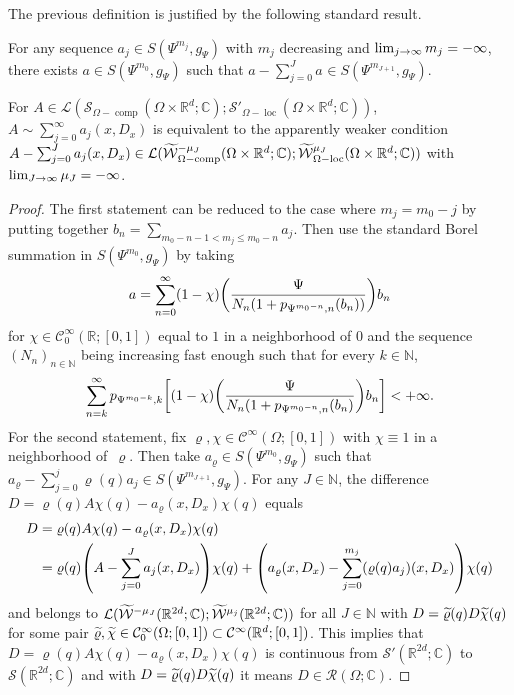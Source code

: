 \documentclass[10pt]{amsart}
\theoremstyle{definition}\newtheorem{defi}[theo]{Definition}\newtheorem{rema}[theo]{Remark}\newtheorem{exam}[theo]{Example}\newtheorem{exem}[theo]{Example}\newtheorem{nota}[theo]{Notation}
\newcommand{\C}{\mathbb{C}}
\newcommand{\R}{\mathbb{R}}
\newcommand{\N}{\mathbb{N}}
\newcommand{\clW}{\mathcal{W}}
\newcommand{\clC}{\mathcal{C}}
\newcommand{\clS}{\mathcal{S}}
\newcommand{\clL}{\mathcal{L}}
\newcommand{\clR}{\mathcal{R}}
\DeclareMathOperator{\ccomp}{comp}
\DeclareMathOperator{\locc}{loc}
\let\oldtilde\tilde
\renewcommand*{\tilde}[1]{\mathchoice{\widetilde{#1}}{\widetilde{#1}}{\oldtilde{#1}}{\oldtilde{#1}}}
\let\originalleft\left
\let\originalright\right
\renewcommand{\left}{\mathopen{}\mathclose\bgroup\originalleft}
\renewcommand{\right}{\aftergroup\egroup\originalright}
\renewcommand*{\to}{\mathchoice{\longrightarrow}{\rightarrow}{\rightarrow}{\rightarrow}}
\begin{document}
The previous definition is justified by the following standard result.
\begin{prop}\label{pr:asympsum}
For any sequence $a_{j}\in S(\Psi^{m_{j}},g_{\Psi})$ with $m_{j}$ decreasing and $\lim_{j\to\infty}m_{j}=-\infty$, there exists $a\in S(\Psi^{m_{0}},g_{\Psi})$ such that $a-\sum_{j=0}^{J}a_{}\in S(\Psi^{m_{J+1}},g_{\Psi})$.

For $A\in \clL(\clS_{\Omega-\ccomp}(\Omega\times\R^{d};\C);\clS'_{\Omega-\locc}(\Omega\times\R^{d};\C))$, $A\sim \sum_{j=0}^{\infty}a_{j}(x,D_{x})$ is equivalent to the apparently weaker condition $A-\sum_{j=0}^{J}a_{j}(x,D_{x})\in \clL(\tilde{\clW}^{-\mu_{J}}_{\Omega-\ccomp}(\Omega\times\R^{d};\C);\tilde{\clW}^{\mu_{J}}_{\Omega-\locc}(\Omega\times\R^{d};\C))$ with $\lim_{J\to\infty}\mu_{J}=-\infty$.
\end{prop}

\begin{proof}
The first statement can be reduced to the case where $m_{j}=m_{0}-j$ by putting together $b_{n}=\sum_{m_{0}-n-1<m_{j}\leq m_{0}-n}a_{j}$. Then use the standard Borel summation in $S(\Psi^{m_{0}},g_{\Psi})$ by taking
\[
a=\sum_{n=0}^{\infty}(1-\chi)\left(\frac{\Psi}{N_{n}(1+p_{\Psi^{m_{0}-n},n}(b_{n}))}\right) b_{n}
\]
for $\chi\in \clC^{\infty}_{0}(\R;[0,1])$ equal to $1$ in a neighborhood of $0$ and the sequence $(N_{n})_{n\in \N}$ being increasing fast enough such that for every $k\in \N$,
\[
\sum_{n=k}^{\infty}p_{\Psi^{m_{0}-k},k}\left[(1-\chi)\left(\frac{\Psi}{N_{n}(1+p_{\Psi^{m_{0}-n},n}(b_{n})}\right)b_{n}\right]<+\infty.
\]
For the second statement, fix $\varrho,\chi\in \clC^{\infty}(\Omega;[0,1])$ with $\chi\equiv 1$ in a neighborhood of~$\varrho$. Then take $a_{\varrho}\in S(\Psi^{m_{0}},g_{\Psi})$ such that $a_{\varrho}-\sum_{j=0}^{j}\varrho(q)a_{j}\in S(\Psi^{m_{J+1}},g_{\Psi})$. For any $J\in \N$, the difference $D=\varrho(q)A\chi(q)-a_{\varrho}(x,D_{x})\chi(q)$ equals
\begin{align*}
D&=\varrho(q)A \chi(q)-a_{\varrho}(x,D_{x})\chi(q)
\\ &=\varrho(q)
\left(A-\sum_{j=0}^{J}a_{j}(x,D_{x})\right)\chi(q)+\left(a_{\varrho}(x,D_{x})-\sum_{j=0}^{m_{j}}(\varrho(q)a_{j})(x,D_{x})\right)\chi(q)
\end{align*}
and belongs to $\clL(\tilde{\clW}^{-\mu_{J}}(\R^{2d};\C);\tilde{\clW}^{\mu_{j}}(\R^{2d};\C))$ for all $J\in \N$ with $D=\tilde{\varrho}(q)D\tilde{\chi}(q)$ for some pair $\tilde{\varrho},\tilde{\chi}\in \clC^{\infty}_{0}(\Omega;[0,1])\subset \clC^{\infty}(\R^{d};[0,1])$. This implies that $D=\varrho(q)A\chi(q)-a_{\varrho}(x,D_{x})\chi(q)$ is continuous from $\clS'(\R^{2d};\C)$ to $\clS(\R^{2d};\C)$ and with $D=\tilde{\varrho}(q)D\tilde{\chi}(q)$ it means $D\in \clR(\Omega;\C)$.
\end{proof}
\end{document}
